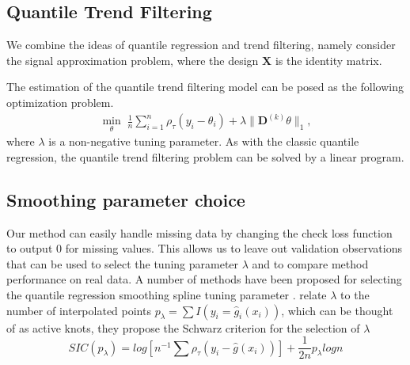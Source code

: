 \documentclass[12pt]{article}
\begin{document}
	\subsection{Quantile Trend Filtering}
	
	We combine the ideas of quantile regression and trend filtering, namely consider the signal approximation problem, where the design $\mathbf{X}$ is the identity matrix.
	
	The estimation of the quantile trend filtering model can be posed as the following optimization problem.
	\begin{eqnarray}
	\label{eq:quantile_trend}
	\underset{\theta}{\min}\; \frac{1}{n} \sum_{i=1}^n \rho_\tau(y_i - \theta_i) + \lambda \lVert \mathbf{D}^{(k)} \theta \rVert_1,
	\end{eqnarray}
	where $\lambda$ is a non-negative tuning parameter. As with the classic quantile regression, the quantile trend filtering problem can be solved by a linear program. 
	
	\subsection{Smoothing parameter choice}
	Our method can easily handle missing data by changing the check loss function to output 0 for missing values. This allows us to leave out validation observations that can be used to select the tuning parameter $\lambda$ and to compare method performance on real data. A number of methods have been proposed for selecting the quantile regression smoothing spline tuning parameter \cite{yuan2006gacv}.  \cite{KoenkerNgPortnoy1994} relate $\lambda$ to the number of interpolated points $p_{\lambda} = \sum I(y_i = \widehat{g}_i(x_i))$, which can be thought of as active knots, they propose the Schwarz criterion for the selection of $\lambda$
	\begin{equation}
	SIC(p_{\lambda}) = log[n^{-1}\sum\rho_{\tau}(y_i - \widehat{g}(x_i))] + \frac{1}{2n}p_{\lambda}log n
	\end{equation}
	
\end{document}

